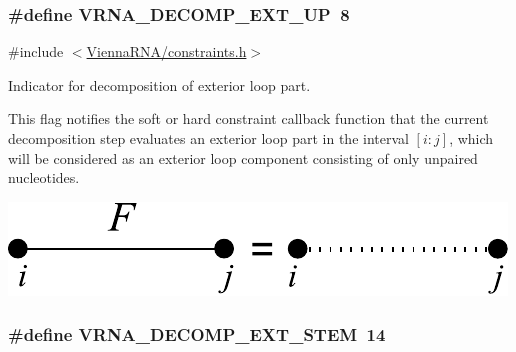 \subsubsection[{\texorpdfstring{V\+R\+N\+A\+\_\+\+D\+E\+C\+O\+M\+P\+\_\+\+E\+X\+T\+\_\+\+UP}{VRNA_DECOMP_EXT_UP}}]{\setlength{\rightskip}{0pt plus 5cm}\#define V\+R\+N\+A\+\_\+\+D\+E\+C\+O\+M\+P\+\_\+\+E\+X\+T\+\_\+\+UP~8}\hypertarget{group__constraints_gaff1ddaffe86d984623910b40cc8a8717}{}\label{group__constraints_gaff1ddaffe86d984623910b40cc8a8717}


{\ttfamily \#include $<$\hyperlink{constraints_8h}{Vienna\+R\+N\+A/constraints.\+h}$>$}



Indicator for decomposition of exterior loop part. 

This flag notifies the soft or hard constraint callback function that the current decomposition step evaluates an exterior loop part in the interval $[i:j]$, which will be considered as an exterior loop component consisting of only unpaired nucleotides.

 
\begin{DoxyImageNoCaption}
  \mbox{\includegraphics[width=\textwidth,height=\textheight/2,keepaspectratio=true]{decomp_ext_up}}
\end{DoxyImageNoCaption}
\subsubsection[{\texorpdfstring{V\+R\+N\+A\+\_\+\+D\+E\+C\+O\+M\+P\+\_\+\+E\+X\+T\+\_\+\+S\+T\+EM}{VRNA_DECOMP_EXT_STEM}}]{\setlength{\rightskip}{0pt plus 5cm}\#define V\+R\+N\+A\+\_\+\+D\+E\+C\+O\+M\+P\+\_\+\+E\+X\+T\+\_\+\+S\+T\+EM~14}\hypertarget{group__constraints_gae44b5ace0d9b4a29088069ecb4cec441}{}\label{group__constraints_gae44b5ace0d9b4a29088069ecb4cec441}


